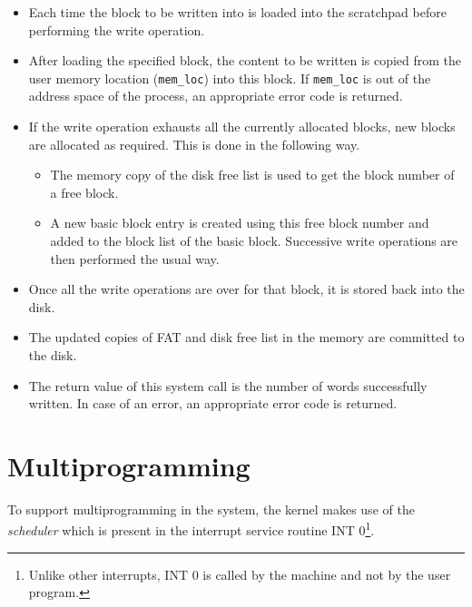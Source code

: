 \documentclass[11pt]{report}
\begin{document}
\begin{itemize}
	\item Each time the block to be written into is loaded into the scratchpad before performing the write operation.
	
	\item After loading the specified block, the content to be written is copied from the user memory location (\texttt{mem\_loc}) into this block. If \texttt{mem\_loc} is out of the address space of the process, an appropriate error code is returned.
	
	\item If the write operation exhausts all the currently allocated blocks, new blocks are allocated as required. This is done in the following way.
	\begin{itemize}
		\item The memory copy of the disk free list  is used to get the block number of a free block.
		\item A new basic block entry is created using this free block number and added to the block list of the basic block. Successive write operations are then performed the usual way.
	\end{itemize}
	
	\item Once all the write operations are over for that block, it is stored back into the disk.
	
	\item The updated copies of FAT  and disk free list 
	 in the memory are committed to the disk.
	
	\item The return value of this system call is the number of words successfully written. In case of an error, an appropriate error code is returned.
\end{itemize}

\chapter{Multiprogramming}
\label{chp:multiprog}
To support multiprogramming in the system, the kernel makes use of the \emph{scheduler} which is present in the interrupt service routine INT 0\footnote{Unlike other interrupts, INT 0 is called by the machine and not by the user program.}.
\end{document}
